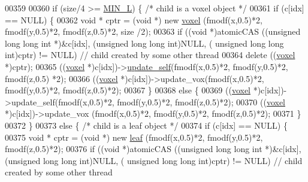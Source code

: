 \begin{DoxyCode}
{00359 
00360         \textcolor{keywordflow}{if} (size/4 >= \hyperlink{Voxel_8cuh_a29d8f4bb35f9fa62e1d680bc6ab1f4f1}{MIN\_L}) \{ \textcolor{comment}{/* child is a voxel object */}
00361             \textcolor{keywordflow}{if} (c[idx] == NULL) \{
00362                 \textcolor{keywordtype}{void} * cptr = (\textcolor{keywordtype}{void} *) \textcolor{keyword}{new} \hyperlink{classvoxel}{voxel} (fmodf(x,0.5)*2, fmodf(y,0.5)*2, fmodf(z,0.5)*2, size
      /2);
00363                 \textcolor{keywordflow}{if} ((\textcolor{keywordtype}{void} *)atomicCAS ((\textcolor{keywordtype}{unsigned} \textcolor{keywordtype}{long} \textcolor{keywordtype}{long} \textcolor{keywordtype}{int} *)&c[idx], (\textcolor{keywordtype}{unsigned} \textcolor{keywordtype}{long} \textcolor{keywordtype}{long} \textcolor{keywordtype}{int})NULL, (\textcolor{keywordtype}{
      unsigned} \textcolor{keywordtype}{long} \textcolor{keywordtype}{long} \textcolor{keywordtype}{int})cptr) != NULL) \textcolor{comment}{// child created by some other thread}
00364                     \textcolor{keyword}{delete} ((\hyperlink{classvoxel}{voxel} *)cptr);
00365                 ((\hyperlink{classvoxel}{voxel} *)c[idx])->\hyperlink{classvoxel_a1748472909af5ef1f28d0a0c6648dbbd}{update\_self}(fmodf(x,0.5)*2, fmodf(y,0.5)*2, fmodf(z,0.5)
      *2);
00366                 ((\hyperlink{classvoxel}{voxel} *)c[idx])->update\_vox(fmodf(x,0.5)*2, fmodf(y,0.5)*2, fmodf(z,0.5)*2);
00367             \}
00368             \textcolor{keywordflow}{else} \{
00369                 ((\hyperlink{classvoxel}{voxel} *)c[idx])->update\_self(fmodf(x,0.5)*2, fmodf(y,0.5)*2, fmodf(z,0.5)*2);
00370                 ((\hyperlink{classvoxel}{voxel} *)c[idx])->update\_vox (fmodf(x,0.5)*2, fmodf(y,0.5)*2, fmodf(z,0.5)*2);
00371             \}
00372         \}
00373         \textcolor{keywordflow}{else} \{ \textcolor{comment}{/* child is a leaf object */}
00374             \textcolor{keywordflow}{if} (c[idx] == NULL) \{
00375                 \textcolor{keywordtype}{void} * cptr = (\textcolor{keywordtype}{void} *) \textcolor{keyword}{new} \hyperlink{classleaf}{leaf} (fmodf(x,0.5)*2, fmodf(y,0.5)*2, fmodf(z,0.5)*2);
00376                 \textcolor{keywordflow}{if} ((\textcolor{keywordtype}{void} *)atomicCAS ((\textcolor{keywordtype}{unsigned} \textcolor{keywordtype}{long} \textcolor{keywordtype}{long} \textcolor{keywordtype}{int} *)&c[idx], (\textcolor{keywordtype}{unsigned} \textcolor{keywordtype}{long} \textcolor{keywordtype}{long} \textcolor{keywordtype}{int})NULL, (\textcolor{keywordtype}{
      unsigned} \textcolor{keywordtype}{long} \textcolor{keywordtype}{long} \textcolor{keywordtype}{int})cptr) != NULL) \textcolor{comment}{// child created by some other thread}
}
\end{DoxyCode}
